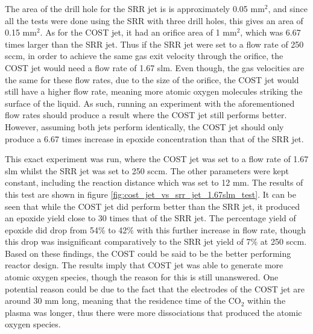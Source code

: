 The area of the drill hole for the SRR jet is is approximately 0.05 mm$^2$, and since all the tests were done using the SRR with three drill holes, this gives an area of 0.15 mm$^2$. As for the COST jet, it had an orifice area of 1 mm$^2$, which was 6.67 times larger than the SRR jet. Thus if the SRR jet were set to a flow rate of 250 sccm, in order to achieve the same gas exit velocity through the orifice, the COST jet would need a flow rate of 1.67 slm. Even though, the gas velocities are the same for these flow rates, due to the size of the orifice, the COST jet would still have a higher flow rate, meaning more atomic oxygen molecules striking the surface of the liquid. As such, running an experiment with the aforementioned flow rates should produce a result where the COST jet still performs better. However, assuming both jets perform identically, the COST jet should only produce a 6.67 times increase in epoxide concentration than that of the SRR jet.

This exact experiment was run, where the COST jet was set to a flow rate of 1.67 slm whilst the SRR jet was set to 250 sccm. The other parameters were kept constant, including the reaction distance which was set to 12 mm. The results of this test are shown in figure \ref{fig:cost_jet_vs_srr_jet_1.67slm_test}. It can be seen that while the COST jet did perform better than the SRR jet, it produced an epoxide yield close to 30 times that of the SRR jet. The percentage yield of epoxide did drop from 54\% to 42\% with this further increase in flow rate, though this drop was insignificant comparatively to the SRR jet yield of 7\% at 250 sccm. Based on these findings, the COST could be said to be the better performing reactor design. The results imply that COST jet was able to generate more atomic oxygen species, though the reason for this is still unanswered. One potential reason could be due to the fact that the electrodes of the COST jet are around 30 mm long, meaning that the residence time of the CO$_2$ within the plasma was longer, thus there were more dissociations that produced the atomic oxygen species. 

